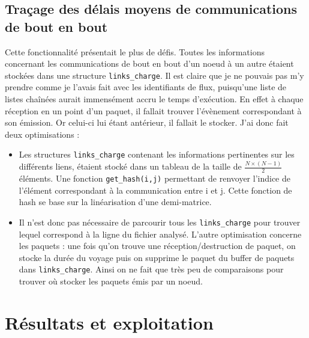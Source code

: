 \documentclass[
10pt, %
a4paper, %
oneside, %
headinclude,footinclude, %
BCOR5mm, %
]{scrartcl}
\begin{document}
\subsection{Traçage des délais moyens de communications de bout en bout}
Cette fonctionnalité présentait le plus de défis. Toutes les informations concernant les communications de bout en bout d'un noeud à un autre étaient stockées dans une structure \texttt{links\_charge}. Il est claire que je ne pouvais pas m'y prendre comme je l'avais fait avec les identifiants de flux, puisqu'une liste de listes chaînées aurait immensément accru le temps d'exécution. En effet à chaque réception en un point d'un paquet, il fallait trouver l'évènement correspondant à son émission. Or celui-ci lui étant antérieur, il fallait le stocker. J'ai donc fait deux optimisations :
\begin{itemize}
	\item{Les structures \texttt{links\_charge} contenant les informations pertinentes sur les différents liens, étaient stocké dans un tableau de la taille de $ \frac{  N \times (N-1) }{2} $ } éléments. Une fonction \texttt{get\_hash(i,j)} permettant de renvoyer l'indice de l'élément correspondant à la communication entre i et j. Cette fonction de hash se base sur la linéarisation d'une demi-matrice.
	\item{Il n'est donc pas nécessaire de parcourir tous les \texttt{links\_charge} pour trouver lequel correspond à la ligne du fichier analysé. L'autre optimisation concerne les paquets : une fois qu'on trouve une réception/destruction de paquet, on stocke la durée du voyage puis on supprime le paquet du buffer de paquets dans \texttt{links\_charge}. Ainsi on ne fait que très peu de comparaisons pour trouver où stocker les paquets émis par un noeud.}

\end{itemize}

\section{Résultats et exploitation}
\end{document}
